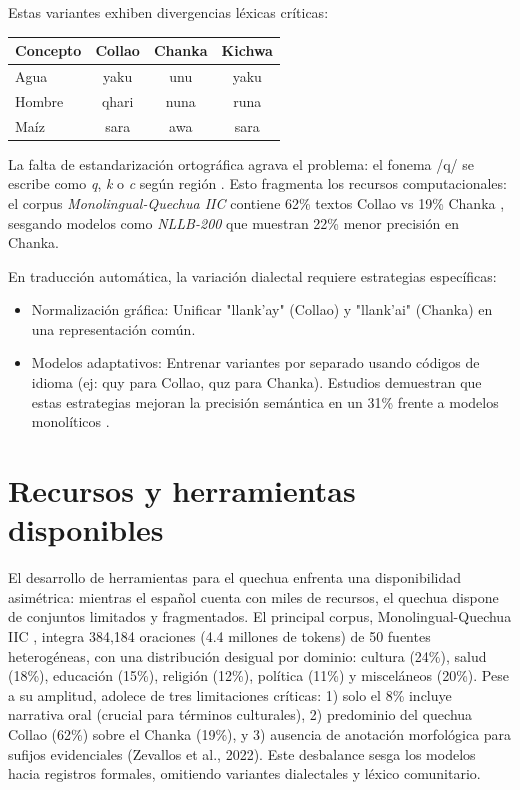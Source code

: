         Estas variantes exhiben divergencias léxicas críticas:
        
        \begin{table}[h!]
        \centering
        \begin{tabular}{|l|c|c|c|}
        \hline
        \textbf{Concepto} & \textbf{Collao} & \textbf{Chanka} & \textbf{Kichwa} \\
        \hline
        Agua & yaku & unu & yaku \\
        Hombre & qhari & nuna & runa \\
        Maíz & sara & awa & sara \\
        \hline
        \end{tabular}
        \end{table}
        
        La falta de estandarización ortográfica agrava el problema: el fonema /q/ se escribe como \textit{q}, \textit{k} o \textit{c} según región \cite{cusihuaman1976gramatica}. Esto fragmenta los recursos computacionales: el corpus \textit{Monolingual-Quechua IIC} contiene 62\% textos Collao vs 19\% Chanka \cite{zevallos2024tema}, sesgando modelos como \textit{NLLB-200} que muestran 22\% menor precisión en Chanka.
        
        En traducción automática, la variación dialectal requiere estrategias específicas:
        \begin{itemize}
            \item Normalización gráfica: Unificar "llank'ay" (Collao) y "llank'ai" (Chanka) en una representación común.

            \item Modelos adaptativos: Entrenar variantes por separado usando códigos de idioma (ej: quy para Collao, quz para Chanka).
            Estudios demuestran que estas estrategias mejoran la precisión semántica en un 31\% frente a modelos monolíticos \cite{rios2015basic}.
            
        \end{itemize}
        
    \section{Recursos y herramientas disponibles}
    El desarrollo de herramientas para el quechua enfrenta una disponibilidad asimétrica: mientras el español cuenta con miles de recursos, el quechua dispone de conjuntos limitados y fragmentados. El principal corpus, Monolingual-Quechua IIC \cite{zevallos2024tema}, integra 384,184 oraciones (4.4 millones de tokens) de 50 fuentes heterogéneas, con una distribución desigual por dominio: cultura (24\%), salud (18\%), educación (15\%), religión (12\%), política (11\%) y misceláneos (20\%). Pese a su amplitud, adolece de tres limitaciones críticas: 1) solo el 8\% incluye narrativa oral (crucial para términos culturales), 2) predominio del quechua Collao (62\%) sobre el Chanka (19\%), y 3) ausencia de anotación morfológica para sufijos evidenciales (Zevallos et al., 2022). Este desbalance sesga los modelos hacia registros formales, omitiendo variantes dialectales y léxico comunitario.
    
